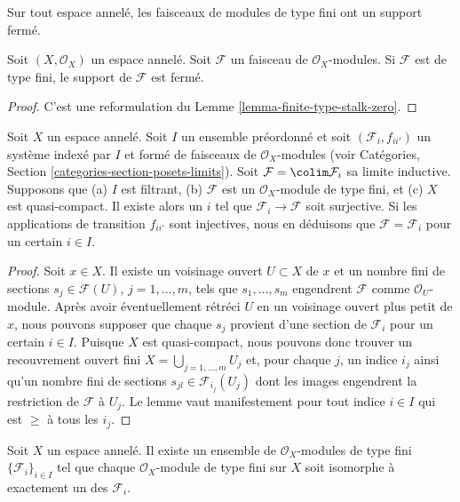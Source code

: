 \begin{lemma}
\label{lemma-support-finite-type-closed}
\begin{slogan}
Sur tout espace annelé, les faisceaux de modules de type fini ont un support
fermé.
\end{slogan}
Soit $(X, \mathcal{O}_X)$ un espace annelé. Soit $\mathcal{F}$ un faisceau de
$\mathcal{O}_X$-modules. Si $\mathcal{F}$ est de type fini, le support de
$\mathcal{F}$ est fermé.
\end{lemma}

\begin{proof}
C'est une reformulation du Lemme \ref{lemma-finite-type-stalk-zero}.
\end{proof}

\begin{lemma}
\label{lemma-finite-type-quasi-compact-colimit}
Soit $X$ un espace annelé. Soit $I$ un ensemble préordonné et soit
$(\mathcal{F}_i, f_{ii'})$ un système indexé par $I$ et formé de faisceaux de
$\mathcal{O}_X$-modules (voir Catégories, Section
\ref{categories-section-posets-limits}). Soit
$\mathcal{F} = \colim \mathcal{F}_i$ sa limite inductive. Supposons que
(a) $I$ est filtrant, (b) $\mathcal{F}$ est un $\mathcal{O}_X$-module de type
fini, et (c) $X$ est quasi-compact. Il existe alors un $i$ tel que
$\mathcal{F}_i \to \mathcal{F}$ soit surjective. Si les applications de
transition $f_{ii'}$ sont injectives, nous en déduisons que
$\mathcal{F} = \mathcal{F}_i$ pour un certain $i \in I$.
\end{lemma}

\begin{proof}
Soit $x \in X$. Il existe un voisinage ouvert $U \subset X$ de $x$ et un
nombre fini de sections $s_j \in \mathcal{F}(U)$, $j = 1, \ldots, m$, tels
que $s_1, \ldots, s_m$ engendrent $\mathcal{F}$ comme
$\mathcal{O}_U$-module. Après avoir éventuellement rétréci $U$ en un voisinage
ouvert plus petit de $x$, nous pouvons supposer que chaque $s_j$ provient
d'une section de $\mathcal{F}_i$ pour un certain $i \in I$. Puisque $X$ est
quasi-compact, nous pouvons donc trouver un recouvrement ouvert fini
$X = \bigcup_{j = 1, \ldots, m} U_j$ et, pour chaque $j$, un indice $i_j$
ainsi qu'un nombre fini de sections
$s_{jl} \in \mathcal{F}_{i_j}(U_j)$ dont les images engendrent la restriction
de $\mathcal{F}$ à $U_j$. Le lemme vaut manifestement pour tout indice
$i \in I$ qui est $\geq$ à tous les $i_j$.
\end{proof}

\begin{lemma}
\label{lemma-set-isomorphism-classes-finite-type-modules}
Soit $X$ un espace annelé. Il existe un ensemble de
$\mathcal{O}_X$-modules de type fini $\{\mathcal{F}_i\}_{i \in I}$ tel que
chaque $\mathcal{O}_X$-module de type fini sur $X$ soit isomorphe à exactement
un des $\mathcal{F}_i$.
\end{lemma}

